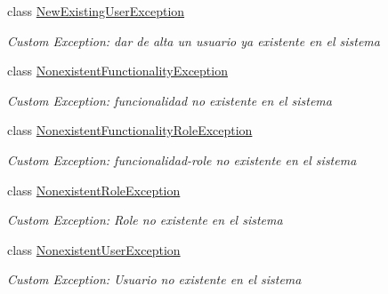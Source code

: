 \begin{DoxyCompactItemize}
class \hyperlink{class_h_k_supply_1_1_exceptions_1_1_new_existing_user_exception}{New\+Existing\+User\+Exception}
\begin{DoxyCompactList}\small\item\em Custom Exception\+: dar de alta un usuario ya existente en el sistema \end{DoxyCompactList}\item 
class \hyperlink{class_h_k_supply_1_1_exceptions_1_1_nonexistent_functionality_exception}{Nonexistent\+Functionality\+Exception}
\begin{DoxyCompactList}\small\item\em Custom Exception\+: funcionalidad no existente en el sistema \end{DoxyCompactList}\item 
class \hyperlink{class_h_k_supply_1_1_exceptions_1_1_nonexistent_functionality_role_exception}{Nonexistent\+Functionality\+Role\+Exception}
\begin{DoxyCompactList}\small\item\em Custom Exception\+: funcionalidad-\/role no existente en el sistema \end{DoxyCompactList}\item 
class \hyperlink{class_h_k_supply_1_1_exceptions_1_1_nonexistent_role_exception}{Nonexistent\+Role\+Exception}
\begin{DoxyCompactList}\small\item\em Custom Exception\+: Role no existente en el sistema \end{DoxyCompactList}\item 
class \hyperlink{class_h_k_supply_1_1_exceptions_1_1_nonexistent_user_exception}{Nonexistent\+User\+Exception}
\begin{DoxyCompactList}\small\item\em Custom Exception\+: Usuario no existente en el sistema \end{DoxyCompactList}\end{DoxyCompactItemize}
